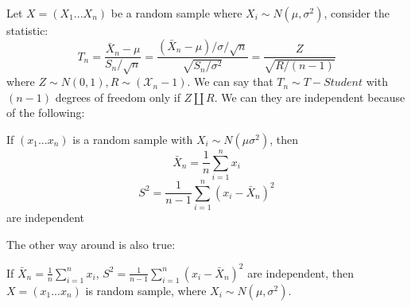 Let $X=(X_1...X_n)$ be a random sample where $X_i\sim N(\mu,\sigma^2)$, consider the statistic:
$$T_n=\frac{\bar X_n-\mu}{ S_n/\sqrt{n}}=\frac{(\bar X_n-\mu)/\sigma/\sqrt{n}}{\sqrt{S_n/\sigma^2}}=\frac{Z}{\sqrt{R/(n-1)}}$$
where $Z\sim N(0,1), R\sim(\mathcal{X}_n-1)$.
We can say that $T_n\sim T-Student$ with $(n-1)$ degrees of freedom only if $Z \coprod R$. We can they are independent because of the following:
\begin{teo}
	If $(x_1...x_n)$ is a random sample with $X_i\sim N(\mu \sigma^2)$, then 
	$$\bar X_n =\frac{1}{n} \sum_{i=1}^{n} x_i$$	
	$$S^2=\frac{1}{n-1} \sum_{i=1}^{n} (x_i -\bar X_n)^2$$
	are independent
\end{teo}
The other way around is also true:
\begin{teo}
	If $\bar X_n =\frac{1}{n} \sum_{i=1}^{n} x_i$, $S^2=\frac{1}{n-1}\sum_{i=1}^{n} (x_i -\bar X_n)^2$ are independent, then $X=(x_1...x_n)$ is random sample, where $X_i\sim N(\mu, \sigma^2)$.
\end{teo}

